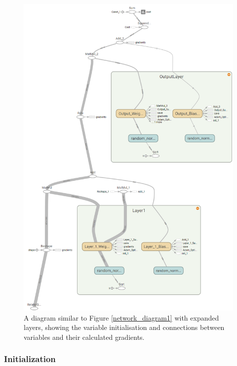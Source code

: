 \documentclass[a4paper,11pt,notitlepage]{article}
\begin{document}
\begin{figure}[H]
	\centering
	\vspace{0.5cm}
	\includegraphics[scale = 0.5]{figs/network_diagram3.png}
	\caption{A diagram similar to Figure \ref{network_diagram1} with expanded layers, showing the variable initialisation and connections between variables and their calculated gradients.}
	\label{network_diagram2}
\end{figure}


\subsubsection{Initialization}
\end{document}
